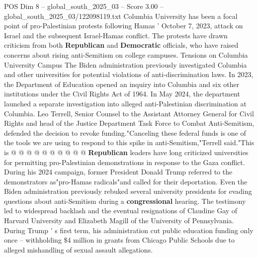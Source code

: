 \begin{textsample}{POS Dim 8 – global\_south\_2025\_03 – Score 3.00 – global\_south\_2025\_03/122098119.txt}
Columbia University has been a focal point of pro-Palestinian protests following Hamas ' October 7, 2023, attack on Israel and the subsequent Israel-Hamas conflict.
The protests have drawn criticism from both \textbf{Republican} and \textbf{Democratic} officials, who have raised concerns about rising anti-Semitism on college campuses.
Tensions on Columbia University Campus The Biden administration previously investigated Columbia and other universities for potential violations of anti-discrimination laws.
In 2023, the Department of Education opened an inquiry into Columbia and six other institutions under the Civil Rights Act of 1964.
In May 2024, the department launched a separate investigation into alleged anti-Palestinian discrimination at Columbia.
Leo Terrell, Senior Counsel to the Assistant Attorney General for Civil Rights and head of the Justice Department Task Force to Combat Anti-Semitism, defended the decision to revoke funding."Canceling these federal funds is one of the tools we are using to respond to this spike in anti-Semitism,"Terrell said."This is @ @ @ @ @ @ @ @ @ @ \textbf{Republican} leaders have long criticized universities for permitting pro-Palestinian demonstrations in response to the Gaza conflict.
During his 2024 campaign, former President Donald Trump referred to the demonstrators as"pro-Hamas radicals"and called for their deportation.
Even the Biden administration previously rebuked several university presidents for evading questions about anti-Semitism during a \textbf{congressional} hearing.
The testimony led to widespread backlash and the eventual resignations of Claudine Gay of Harvard University and Elizabeth Magill of the University of Pennsylvania.
During Trump ' s first term, his administration cut public education funding only once -- withholding \$4 million in grants from Chicago Public Schools due to alleged mishandling of sexual assault allegations.

\end{textsample}

